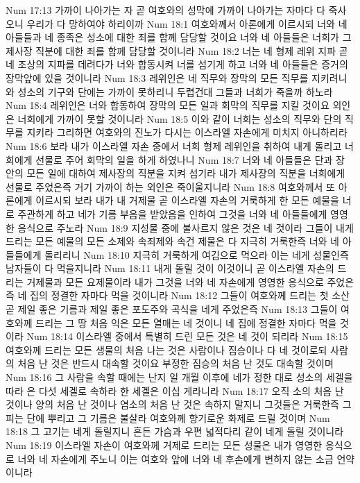 Num 17:13  가까이 나아가는 자 곧 여호와의 성막에 가까이 나아가는 자마다 다 죽사오니 우리가 다 망하여야 하리이까
Num 18:1  여호와께서 아론에게 이르시되 너와 네 아들들과 네 종족은 성소에 대한 죄를 함께 담당할 것이요 너와 네 아들들은 너희가 그 제사장 직분에 대한 죄를 함께 담당할 것이니라
Num 18:2  너는 네 형제 레위 지파 곧 네 조상의 지파를 데려다가 너와 합동시켜 너를 섬기게 하고 너와 네 아들들은 증거의 장막앞에 있을 것이니라
Num 18:3  레위인은 네 직무와 장막의 모든 직무를 지키려니와 성소의 기구와 단에는 가까이 못하리니 두렵건대 그들과 너희가 죽을까 하노라
Num 18:4  레위인은 너와 합동하여 장막의 모든 일과 회막의 직무를 지킬 것이요 외인은 너희에게 가까이 못할 것이니라
Num 18:5  이와 같이 너희는 성소의 직무와 단의 직무를 지키라 그리하면 여호와의 진노가 다시는 이스라엘 자손에게 미치지 아니하리라
Num 18:6  보라 내가 이스라엘 자손 중에서 너희 형제 레위인을 취하여 내게 돌리고 너희에게 선물로 주어 회막의 일을 하게 하였나니
Num 18:7  너와 네 아들들은 단과 장 안의 모든 일에 대하여 제사장의 직분을 지켜 섬기라 내가 제사장의 직분을 너희에게 선물로 주었은즉 거기 가까이 하는 외인은 죽이울지니라
Num 18:8  여호와께서 또 아론에게 이르시되 보라 내가 내 거제물 곧 이스라엘 자손의 거룩하게 한 모든 예물을 너로 주관하게 하고 네가 기름 부음을 받았음을 인하여 그것을 너와 네 아들들에게 영영한 응식으로 주노라
Num 18:9  지성물 중에 불사르지 않은 것은 네 것이라 그들이 내게 드리는 모든 예물의 모든 소제와 속죄제와 속건 제물은 다 지극히 거룩한즉 너와 네 아들들에게 돌리리니
Num 18:10  지극히 거룩하게 여김으로 먹으라 이는 네게 성물인즉 남자들이 다 먹을지니라
Num 18:11  내게 돌릴 것이 이것이니 곧 이스라엘 자손의 드리는 거제물과 모든 요제물이라 내가 그것을 너와 네 자손에게 영영한 응식으로 주었은즉 네 집의 정결한 자마다 먹을 것이니라
Num 18:12  그들이 여호와께 드리는 첫 소산 곧 제일 좋은 기름과 제일 좋은 포도주와 곡식을 네게 주었은즉
Num 18:13  그들이 여호와께 드리는 그 땅 처음 익은 모든 열매는 네 것이니 네 집에 정결한 자마다 먹을 것이라
Num 18:14  이스라엘 중에서 특별히 드린 모든 것은 네 것이 되리라
Num 18:15  여호와께 드리는 모든 생물의 처음 나는 것은 사람이나 짐승이나 다 네 것이로되 사람의 처음 난 것은 반드시 대속할 것이요 부정한 짐승의 처음 난 것도 대속할 것이며
Num 18:16  그 사람을 속할 때에는 난지 일 개월 이후에 네가 정한 대로 성소의 세겔을 따라 은 다섯 세겔로 속하라 한 세겔은 이십 게라니라
Num 18:17  오직 소의 처음 난 것이나 양의 처음 난 것이나 염소의 처음 난 것은 속하지 말지니 그것들은 거룩한즉 그 피는 단에 뿌리고 그 기름은 불살라 여호와께 향기로운 화제로 드릴 것이며
Num 18:18  그 고기는 네게 돌릴지니 흔든 가슴과 우편 넓적다리 같이 네게 돌릴 것이니라
Num 18:19  이스라엘 자손이 여호와께 거제로 드리는 모든 성물은 내가 영영한 응식으로 너와 네 자손에게 주노니 이는 여호와 앞에 너와 네 후손에게 변하지 않는 소금 언약이니라
